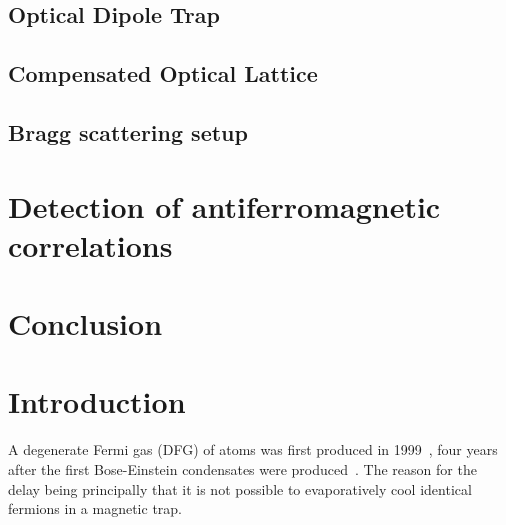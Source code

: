 \documentclass[oneside,12pt]{memoir}
\begin{document}
\section{Optical Dipole Trap}
\section{Compensated Optical Lattice}
\section{Bragg scattering setup} 


\chapter{Detection of antiferromagnetic correlations}

\chapter{Conclusion} 



\chapter{Introduction}

A degenerate Fermi gas (DFG) of atoms was first produced in
1999~\cite{DeMarco1999}, four years after the first Bose-Einstein condensates
were produced~\cite{Cornell1995,Hulet1995,Ketterle1995}.  The reason for the
delay being principally that it is not possible to evaporatively cool identical
fermions in a magnetic trap. 
\end{document}
